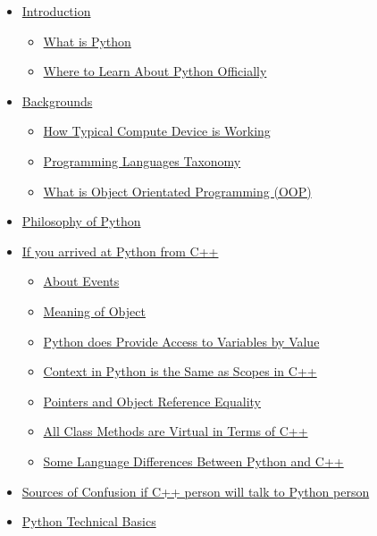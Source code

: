 \documentclass[
]{article}
\begin{document}
\begin{itemize}
\item
  \protect\hyperlink{introduction}{Introduction}

  \begin{itemize}
  \item
    \protect\hyperlink{what-is-python}{What is Python}
  \item
    \protect\hyperlink{where-to-learn-about-python-officially}{Where to
    Learn About Python Officially}
  \end{itemize}
\item
  \protect\hyperlink{backgrounds}{Backgrounds}

  \begin{itemize}
  \item
    \protect\hyperlink{how-typical-compute-device-is-working}{How
    Typical Compute Device is Working}
  \item
    \protect\hyperlink{programming-languages-taxonomy}{Programming
    Languages Taxonomy}
  \item
    \protect\hyperlink{what-is-object-orientated-programming-oop}{What
    is Object Orientated Programming (OOP)}
  \end{itemize}
\item
  \protect\hyperlink{philosophy-of-python}{Philosophy of Python}
\item
  \protect\hyperlink{if-you-arrived-at-python-from-c}{If you arrived at
  Python from C++}

  \begin{itemize}
  \item
    \protect\hyperlink{about-events}{About Events}
  \item
    \protect\hyperlink{meaning-of-object}{Meaning of Object}
  \item
    \protect\hyperlink{python-does-provide-access-to-variables-by-value}{Python
    does Provide Access to Variables by Value}
  \item
    \protect\hyperlink{context-in-python-is-the-same-as-scopes-in-c}{Context
    in Python is the Same as Scopes in C++}
  \item
    \protect\hyperlink{pointers-and-object-reference-equality}{Pointers
    and Object Reference Equality}
  \item
    \protect\hyperlink{all-class-methods-are-virtual-in-terms-of-c}{All
    Class Methods are Virtual in Terms of C++}
  \item
    \protect\hyperlink{some-language-differences-between-python-and-c}{Some
    Language Differences Between Python and C++}
  \end{itemize}
\item
  \protect\hyperlink{sources-of-confusion-if-c-person-will-talk-to-python-person}{Sources
  of Confusion if C++ person will talk to Python person}
\item
  \protect\hyperlink{python-technical-basics}{Python Technical Basics}


\end{itemize}
\end{document}
